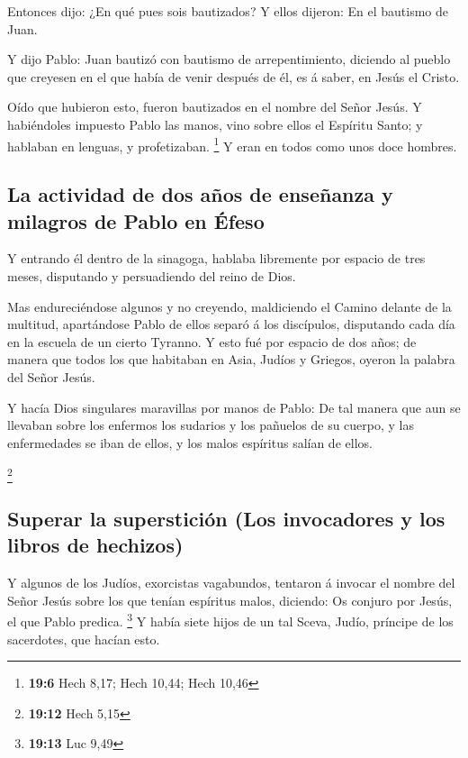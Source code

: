  Entonces dijo: ¿En qué pues sois bautizados? Y ellos
dijeron: En el bautismo de Juan.

 Y dijo Pablo: Juan bautizó con bautismo de
arrepentimiento, diciendo al pueblo que creyesen en el que había de
venir después de él, es á saber, en Jesús el Cristo.

 Oído que hubieron esto, fueron bautizados en el nombre
del Señor Jesús.  Y habiéndoles impuesto Pablo las manos,
vino sobre ellos el Espíritu Santo; y hablaban en lenguas, y
profetizaban. \footnote{\textbf{19:6} Hech 8,17; Hech 10,44; Hech 10,46}
 Y eran en todos como unos doce hombres.

\hypertarget{la-actividad-de-dos-auxf1os-de-enseuxf1anza-y-milagros-de-pablo-en-uxe9feso}{%
\subsection{La actividad de dos años de enseñanza y milagros de Pablo en
Éfeso}\label{la-actividad-de-dos-auxf1os-de-enseuxf1anza-y-milagros-de-pablo-en-uxe9feso}}

 Y entrando él dentro de la sinagoga, hablaba libremente
por espacio de tres meses, disputando y persuadiendo del reino de Dios.

 Mas endureciéndose algunos y no creyendo, maldiciendo el
Camino delante de la multitud, apartándose Pablo de ellos separó á los
discípulos, disputando cada día en la escuela de un cierto Tyranno.
 Y esto fué por espacio de dos años; de manera que todos
los que habitaban en Asia, Judíos y Griegos, oyeron la palabra del Señor
Jesús.

 Y hacía Dios singulares maravillas por manos de Pablo:
 De tal manera que aun se llevaban sobre los enfermos los
sudarios y los pañuelos de su cuerpo, y las enfermedades se iban de
ellos, y los malos espíritus salían de ellos.

\footnote{\textbf{19:12} Hech 5,15}

\hypertarget{superar-la-supersticiuxf3n-los-invocadores-y-los-libros-de-hechizos}{%
\subsection{Superar la superstición (Los invocadores y los libros de
hechizos)}\label{superar-la-supersticiuxf3n-los-invocadores-y-los-libros-de-hechizos}}

 Y algunos de los Judíos, exorcistas vagabundos, tentaron
á invocar el nombre del Señor Jesús sobre los que tenían espíritus
malos, diciendo: Os conjuro por Jesús, el que Pablo predica. \footnote{\textbf{19:13}
  Luc 9,49}  Y había siete hijos de un tal Sceva, Judío,
príncipe de los sacerdotes, que hacían esto.

